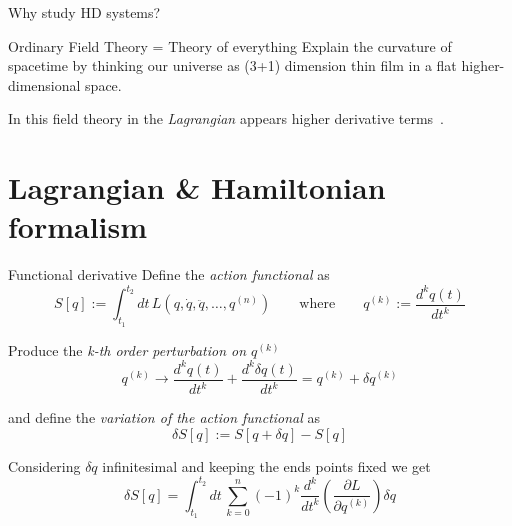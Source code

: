 \documentclass[10pt]{beamer}
\begin{document}
  \begin{frame}{Why study HD systems?}
    \begin{alertblock}{Ordinary Field Theory = Theory of everything}
      \vspace{0.5em}
        Explain the curvature of spacetime by thinking our universe as (3+1)
        dimension thin film in a flat higher-dimensional space.
    \end{alertblock}
    In this field theory in the \emph{Lagrangian} appears \alert{higher
    derivative terms}~\cite{Smilga17}.
  \end{frame}

  \section{Lagrangian \& Hamiltonian formalism}

  \begin{frame}{Functional derivative}
    Define the \emph{action functional} as
    \begin{equation*}
      S[q] := \int_{t_1}^{t_2} dt \,
      L \left(q, \dot{q}, \ddot{q}, \ldots, q^{(n)} \right)
      \qquad \text{where} \qquad q^{(k)} := \frac{d^k q(t)}{dt^k}
    \end{equation*}

    Produce the \emph{k-th order perturbation on $q^{(k)}$}
    \begin{equation*}
      q^{(k)} \rightarrow \frac{d^k q(t)}{dt^k} + \frac{d^k \delta q(t)}{dt^k} =
      q^{(k)} + \delta q^{(k)}
    \end{equation*}

    and define the \emph{variation of the action functional} as
    \begin{equation*}
      \delta S[q] := S[q + \delta q] - S[q]
    \end{equation*}

    Considering $\delta q$ infinitesimal and keeping the ends points fixed we
    get %
    \begin{equation*}
      \delta S[q] = \int_{t_1}^{t_2} dt \,
      \sum_{k=0}^{n} {(-1)}^k \frac{d^k}{dt^k}
      \left(\frac{\partial L}{\partial q^{(k)}}\right) \delta q
    \end{equation*}
  \end{frame}
\end{document}
